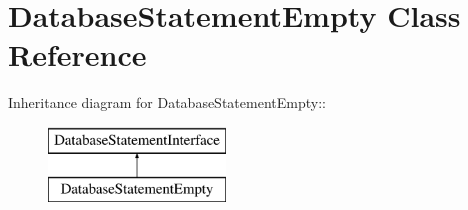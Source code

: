 \hypertarget{classDatabaseStatementEmpty}{
\section{DatabaseStatementEmpty Class Reference}
\label{classDatabaseStatementEmpty}
}
Inheritance diagram for DatabaseStatementEmpty::\begin{figure}[H]
\begin{center}
\leavevmode
\includegraphics[height=2cm]{classDatabaseStatementEmpty}
\end{center}
\end{figure}
